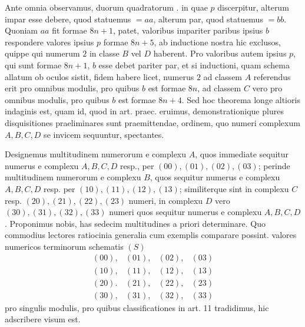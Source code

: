 %
Ante omnia observamus, duorum quadratorum . in quae $p$ discerpitur, alterum impar esse debere, quod statuemus $=aa$, alterum par, quod statuemus $=bb$. Quoniam $aa$ fit formae $8n+1$, patet, valoribus impariter paribus ipsius $b$ respondere valores ipsius $p$ formae $8n+5$, ab inductione nostra hic exclusos, quippe qui numerum $2$ in classe $B$ vel $D$ haberent. Pro valoribus autem ipsius $p$, qui sunt formae $8n+1$, $b$ esse debet pariter par, et si inductioni, quam schema allatum ob oculos sistit, fidem habere licet, numerus $2$ ad classem $A$ referendus erit pro omnibus modulis, pro quibus $b$ est formae $8n$, ad classem $C$ vero pro omnibus modulis, pro quibus $b$ est formae $8n+4$. Sed hoc theorema longe altioris indaginis est, quam id, quod in art. praec. eruimus, demonstrationique plures disquisitiones praeliminares sunt praemittendae, ordinem, quo numeri complexum $A,B,C,D$ se invicem sequuntur, spectantes.

Designemus multitudinem numerorum e complexu $A$, quos immediate sequitur numerus e complexu $A,B,C,D$ resp., per $(00),(01),(02),(03)$; perinde multitudinem numerorum e complexu $B$, quos sequitur numerus e complexu $A,B,C,D$ resp. per $(10),(11),(12),(13)$; similiterque sint in complexu $C$ resp. $(20),(21),(22),(23)$ numeri, in complexu $D$ vero $(30),(31),(32),(33)$ numeri quos sequitur numerus e complexu $A,B,C,D$. Proponimus nobis, has sedecim multitudines a priori determinare. Quo commodius lectores ratiocinia generalia cum exemplis comparare possint. valores numericos terminorum schematis $(S)$
\[
\begin{array}{llll}
(00),&(01),&(02),&(03)\\
(10),&(11),&(12),&(13)\\
(20).&(21),&(22),&(23)\\
(30),&(31),&(32),&(33)
\end{array}
\]
pro singulis modulis, pro quibus classificationes in art. 11 tradidimus, hic adscribere visum est.

